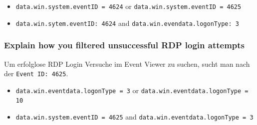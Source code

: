 \begin{itemize}
    \item \lstinline|data.win.system.eventID = 4624| or \lstinline|data.win.system.eventID = 4625|
    \item \lstinline|data.win.sytem.eventID: 4624| and \lstinline|data.win.evendata.logonType: 3|
\end{itemize}

\subsubsection{Explain how you filtered unsuccessful RDP login attempts}
Um erfolglose RDP Login Versuche im Event Viewer zu suchen, sucht man nach der \lstinline|Event ID: 4625|.\\

\begin{itemize}
    \item \lstinline|data.win.eventdata.logonType = 3| or \lstinline|data.win.eventdata.logonType = 10|
    \item \lstinline|data.win.system.eventID = 4625| and \lstinline|data.win.eventdata.logonType = 3|
\end{itemize}
